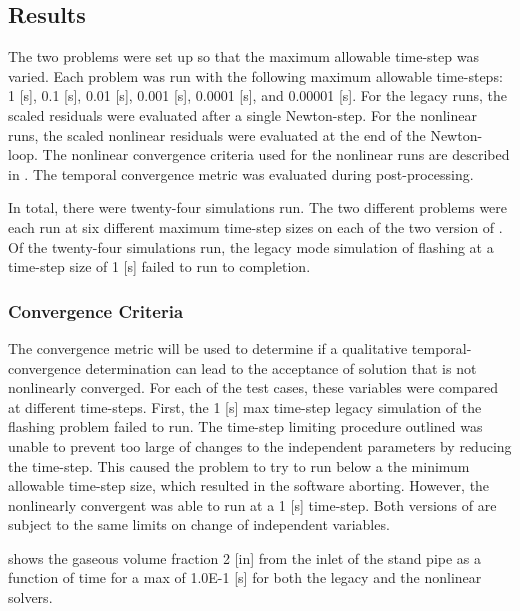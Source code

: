 \subsection{Results}
\label{subsect:results}

The two problems were set up so that the maximum allowable time-step was varied.
Each problem was run with the following maximum allowable time-steps: 1 [s], 0.1 [s], 0.01 [s], 0.001 [s], 0.0001 [s], and 0.00001 [s]. 
For the legacy runs, the scaled residuals were evaluated after a single Newton-step.
For the nonlinear runs, the scaled nonlinear residuals were evaluated at the end of the Newton-loop.
The nonlinear convergence criteria used for the nonlinear runs are described in .
The temporal convergence metric was evaluated during post-processing.

In total, there were twenty-four simulations run.
The two different problems were each run at six different maximum time-step sizes on each of the two version of \cobra.
Of the twenty-four simulations run, the legacy mode simulation of flashing at a time-step size of 1 [s] failed to run to completion.

\subsubsection{Convergence Criteria}
\label{sect:result_temporal_convergence}


The convergence metric will be used to determine if a qualitative temporal-convergence determination can lead to the acceptance of solution that is not nonlinearly converged.
For each of the test cases, these variables were compared at different time-steps.
First, the 1 [s] max time-step legacy simulation of the flashing problem failed to run.
The time-step limiting procedure outlined  was unable to prevent too large of changes to the independent parameters by reducing the time-step.
This caused the problem to try to run below a the minimum allowable time-step size, which resulted in the software aborting.
However, the nonlinearly convergent \cobra{} was able to run at a 1 [s] time-step.
Both versions of \cobra{} are subject to the same limits on change of independent variables.

 shows the gaseous volume fraction 2 [in] from the inlet of the stand pipe as a function of time for a max \dt{} of 1.0E-1 [s] for both the legacy and the nonlinear solvers.


